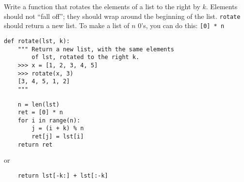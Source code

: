 \question Write a function that rotates the elements of a list to the right by
$k$.  Elements should not ``fall off''; they should wrap around the beginning
of the list.  {\tt rotate} should return a new list.  To make a list of $n$
0's, you can do this: {\tt [0] * n}
\begin{lstlisting}
def rotate(lst, k):
    """ Return a new list, with the same elements
        of lst, rotated to the right k.
    >>> x = [1, 2, 3, 4, 5]
    >>> rotate(x, 3)
    [3, 4, 5, 1, 2]
    """
\end{lstlisting}
\begin{solution}[1in]
\begin{lstlisting}
    n = len(lst)
    ret = [0] * n
    for i in range(n):
        j = (i + k) % n
        ret[j] = lst[i]
    return ret
\end{lstlisting}
or
\begin{lstlisting}
    return lst[-k:] + lst[:-k]
\end{lstlisting}
\end{solution}
